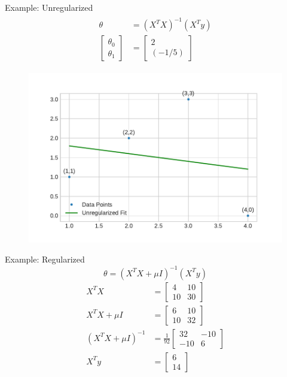 \documentclass{beamer}
\begin{document}
\begin{frame}{Example: Unregularized}
\vspace{0.4cm}
\begin{align*}
\begin{split}
\theta &= (X^{T}X)^{-1}(X^{T}y)\\
\begin{bmatrix}
\theta_{0}\\
\theta_{1}
\end{bmatrix} &= 
\begin{bmatrix}
2\\
(-1/5)
\end{bmatrix} 
\end{split}
\end{align*}
\vspace{-0.8cm}
\begin{figure}
\includegraphics[width=0.8\linewidth]{ridge/q_unreg.pdf}
\end{figure}
\end{frame}

\begin{frame}{Example: Regularized}
\[
\theta = (X^{T}X+\mu I)^{-1}(X^{T}y)
\]
\pause
\begin{align*}
X^{T}X &= \begin{bmatrix}
4 &10\\10&30
\end{bmatrix} \\
X^{T}X+\mu I &= \begin{bmatrix}
6 &10\\10&32
\end{bmatrix} \\
(X^{T}X+\mu I)^{-1} &= \frac{1}{92} \begin{bmatrix}
32 & -10\\
-10& 6
\end{bmatrix}\\
X^{T}y &= \begin{bmatrix}
6\\
14
\end{bmatrix}
\end{align*}
\end{frame}
\end{document}
